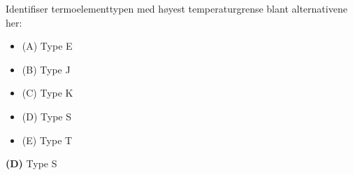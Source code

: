 

Identifiser termoelementtypen med høyest temperaturgrense blant alternativene her:

\begin{itemize}
\item{(A)} Type E
\vskip 5pt 
\item{(B)} Type J
\vskip 5pt 
\item{(C)} Type K
\vskip 5pt 
\item{(D)} Type S
\vskip 5pt 
\item{(E)} Type T
\end{itemize}







{\bf (D)} Type S
 









